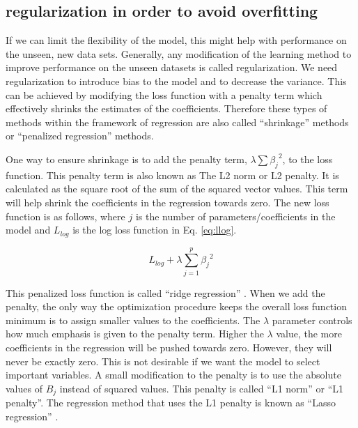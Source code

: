 \documentclass[12pt,]{krantz}
\begin{document}
\hypertarget{regularization-in-order-to-avoid-overfitting}{%
\subsection{regularization in order to avoid overfitting}\label{regularization-in-order-to-avoid-overfitting}}

If we can limit the flexibility of the model, this might help with performance on the unseen, new data sets. Generally, any modification of the learning method to improve performance on the unseen datasets is called regularization. We need regularization to introduce bias to the model and to decrease the variance. This can be achieved by modifying the loss function with a penalty term which effectively shrinks the estimates of the coefficients. Therefore these types of methods within the framework of regression are also called ``shrinkage'' methods or ``penalized regression'' methods.

One way to ensure shrinkage is to add the penalty term, \(\lambda\sum{\beta_j}^2\), to the loss function. This penalty term is also known as The L2 norm or L2 penalty. It is calculated as the square root of the sum of the squared vector values. This term will help shrink the coefficients in the regression towards zero. The new loss function is as follows, where \(j\) is the number of parameters/coefficients in the model and \(L_{log}\) is the log loss function in Eq. \eqref{eq:llog}.

\begin{equation}
L_{log}+\lambda\sum_{j=1}^p{\beta_j}^2
\label{eq:L2norm}
\end{equation}

This penalized loss function is called ``ridge regression'' \citep{hoerl1970ridge}. When we add the penalty, the only way the optimization procedure keeps the overall loss function minimum is to assign smaller values to the coefficients. The \(\lambda\) parameter controls how much emphasis is given to the penalty term. Higher the \(\lambda\) value, the more coefficients in the regression will be pushed towards zero. However, they will never be exactly zero. This is not desirable if we want the model to select important variables. A small modification to the penalty is to use the absolute values of \(B_j\) instead of squared values. This penalty is called ``L1 norm'' or ``L1 penalty''. The regression method that uses the L1 penalty is known as ``Lasso regression'' \citep{tibshirani1996regression}.
\end{document}
